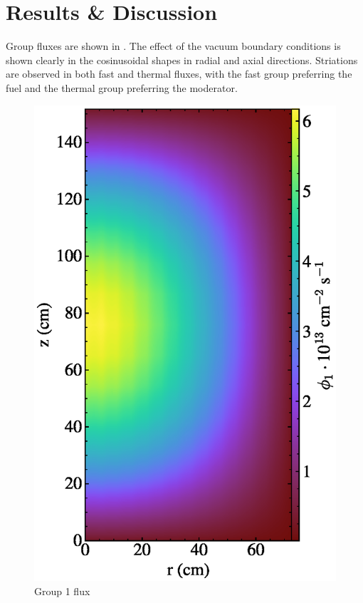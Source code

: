 \documentclass{article}
\let\Oldsection\section
\renewcommand{\section}{\FloatBarrier\Oldsection}
\begin{document}
\section{Results \& Discussion}

Group fluxes are shown in . The effect of the vacuum
boundary conditions is shown clearly in the cosinusoidal shapes in radial and
axial directions. Striations are observed in both fast and thermal fluxes, with
the fast group preferring the fuel and the thermal group preferring the moderator.

\begin{figure}
  \centering
  \includegraphics{auto_diff_rho_group1.eps}
  \caption{Group 1 flux}
  \label{fig:group1}
\end{figure}
\end{document}
